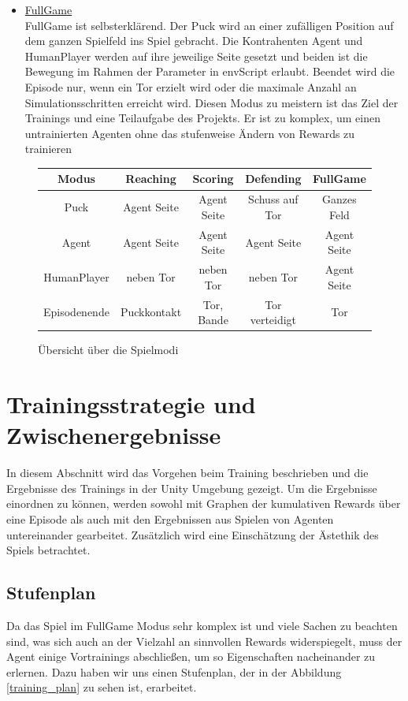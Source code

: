 \begin{itemize}
\item \underline{FullGame} \\
FullGame ist selbsterklärend. Der Puck wird an einer zufälligen Position auf dem ganzen Spielfeld ins Spiel gebracht. Die Kontrahenten Agent und HumanPlayer werden auf ihre jeweilige Seite gesetzt und beiden ist die Bewegung im Rahmen der Parameter in envScript erlaubt. Beendet wird die Episode nur, wenn ein Tor erzielt wird oder die maximale Anzahl an Simulationsschritten erreicht wird. Diesen Modus zu meistern ist das Ziel der Trainings und eine Teilaufgabe des Projekts. Er ist zu komplex, um einen untrainierten Agenten ohne das stufenweise Ändern von Rewards zu trainieren
\end{itemize}

\begin{figure} [h]
\begin{tabular}[h]{c|c|c|c|c}
 Modus & Reaching & Scoring & Defending & FullGame \\
\hline
Puck  & Agent Seite & Agent Seite & Schuss auf Tor & Ganzes Feld \\
\hline
Agent & Agent Seite  & Agent Seite & Agent Seite & Agent Seite \\
\hline
HumanPlayer & neben Tor  & neben Tor & neben Tor & Agent Seite \\
\hline
Episodenende  & Puckkontakt & Tor, Bande & Tor verteidigt & Tor \\
 
\end{tabular}
\caption{Übersicht über die Spielmodi }
\label{modi_uebersicht}
\end{figure}

\section{Trainingsstrategie und Zwischenergebnisse}
\label{sect:trainings_strats}

In diesem Abschnitt wird das Vorgehen beim Training beschrieben und die Ergebnisse des Trainings in der Unity Umgebung gezeigt. Um die Ergebnisse einordnen zu können, werden sowohl mit Graphen der kumulativen Rewards über eine Episode als auch mit den Ergebnissen aus Spielen von Agenten untereinander gearbeitet. Zusätzlich wird eine Einschätzung der Ästethik des Spiels betrachtet.\\

\subsection{Stufenplan}
\label{subsect:stufenplan}
Da das Spiel im FullGame Modus sehr komplex ist und viele Sachen zu beachten sind, was sich auch an der Vielzahl an sinnvollen Rewards widerspiegelt, muss der Agent einige Vortrainings abschließen, um so Eigenschaften nacheinander zu erlernen. Dazu haben wir uns einen Stufenplan, der in der Abbildung \ref{training_plan} zu sehen ist, erarbeitet.

